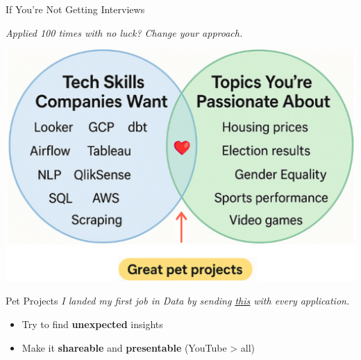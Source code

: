 \documentclass[10pt,a4paper]{article}
\begin{document}
\begin{multicols}{3}
\begin{textbox}{If You're Not Getting Interviews}
\begin{itemize}
	\end{itemize}
\emph{Applied 100 times with no luck? Change your approach.}
\end{textbox}

\begin{textboxWhite}{}
\includegraphics[width=\textwidth]{image.png}
\end{textboxWhite}

	
\begin{textbox}{Pet Projects}
\emph{I landed my first job in Data by sending \underline{\href{https://www.youtube.com/watch?v=54jvW1ulaP0&t=961s}{this}} with every application.}

\begin{itemize}
    \item Try to find \textbf{unexpected} insights
    \item Make it \textbf{shareable} and \textbf{presentable} (YouTube > all)
\end{itemize}


\end{textbox}
\end{multicols}
\end{document}
